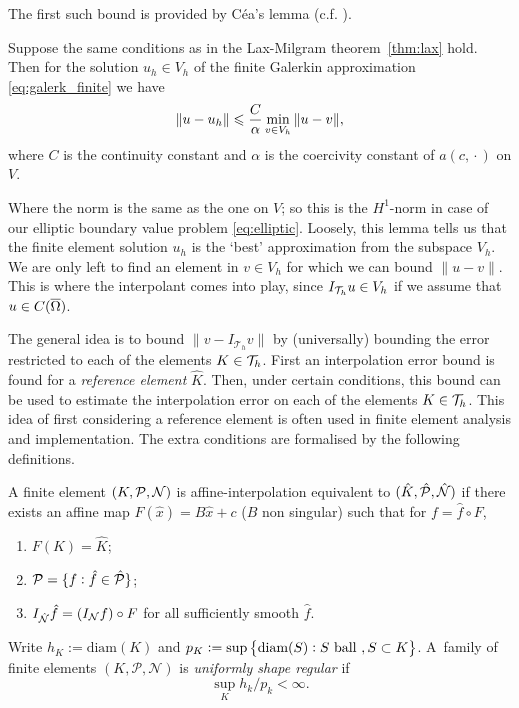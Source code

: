 \documentclass[thesis.tex]{subfiles}
\begin{document}
  The first such bound is provided by C\'ea's lemma (c.f. \cite[Thm~2.8.1]{brenner}).
  \begin{lem}
    Suppose the same conditions as in the Lax-Milgram theorem~\ref{thm:lax} hold. Then for the solution $u_h \in V_h$ of the
    finite Galerkin approximation \eqref{eq:galerk_finite} we have
    \[
      \| u - u_h\| \leq {C \over \alpha} \min_{v \in V_h} \| u - v\|,
    \]
    where $C$ is the continuity constant and $\alpha$ is the coercivity constant of $a(c\dot, \cdot)$ on $V$.
  \end{lem}
  Where the norm is the same as the one on $V$; so this is the $H^1$-norm in case of our elliptic boundary value problem \eqref{eq:elliptic}.
  Loosely, this lemma tells us that the finite element solution $u_h$ is the `best' approximation from the subspace $V_h$. We are
  only left to find an element in $v \in V_h$ for which we can bound $\|u - v\|$. This is where the interpolant comes into play, since $I_{\T_h}u \in V_h$ if we assume that $u \in C(\OO)$.

  The general idea is to bound $\|v - I_{\mathcal{T}_h} v\|$ by (universally) bounding the error restricted to each of the elements $K\in\T_h$.  
  First an interpolation error bound is found for a \emph{reference element} $\hat K$. Then, under certain conditions, this bound can be used to estimate the interpolation error on each of the elements $K \in \T_h$. This idea of first considering a reference element is often 
  used in finite element analysis and implementation. The extra conditions are formalised by the following definitions.
  \begin{defn}
    A finite element $(K, \P, \N)$ is affine-interpolation equivalent to $(\hat K, \hat \P, \hat \N)$ if there
    exists an affine map $ F(\hat x) = B\hat x + c$ ($B$ non singular) such that for $f = \hat f \circ F$,
    \begin{enumerate}[label=(\roman*)]
      \item $F(K) = \hat K$;
      \item $\P = \{f : \hat f \in \hat \P\}$;
    \item $I_{\hat \N} \hat f = \left( I_{\N} f \right)\circ F$ for all sufficiently smooth $\hat f$.
    \end{enumerate}
  \end{defn}
  \begin{defn}
    Write $h_K := \text{diam}(K)$ and $p_K := \sup\set{\text{diam}(S): S \text{ ball }, S \subset K}$.
    A~family of finite elements $(K, \mathcal{P}, \mathcal{N})$ is \emph{uniformly shape regular} if 
    \[
      \sup_K h_k/p_k < \infty.
    \]
  \end{defn}
\end{document}
